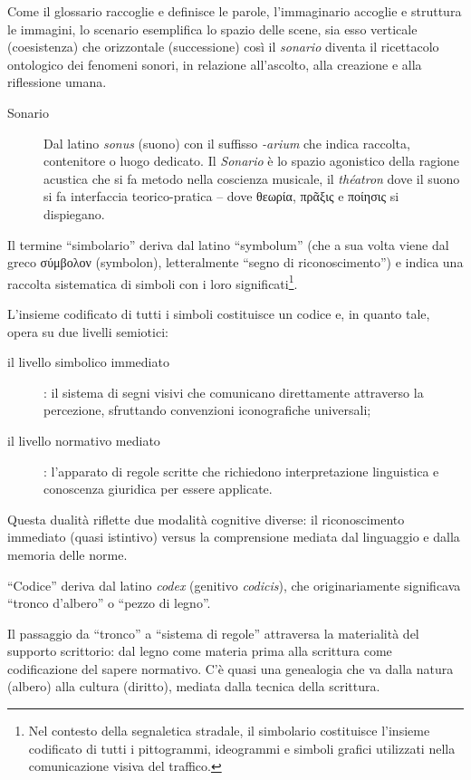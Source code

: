 Come il glossario raccoglie e definisce le parole, l'immaginario accoglie e
struttura le immagini, lo scenario esemplifica lo spazio delle scene, sia esso
verticale (coesistenza) che orizzontale (successione) così il \emph{sonario}
diventa il ricettacolo ontologico dei fenomeni sonori, in relazione all'ascolto,
alla creazione e alla riflessione umana.

\begin{description}
  \item[Sonario] Dal latino \emph{sonus} (suono) con il suffisso \emph{-arium}
  che indica raccolta, contenitore o luogo dedicato. Il \emph{Sonario} è lo
  spazio agonistico della ragione acustica che si fa metodo nella coscienza
  musicale, il \emph{théatron} dove il suono si fa interfaccia teorico-pratica –
  dove \textgreek{θεωρία}, \textgreek{πρᾶξις} e \textgreek{ποίησις} si dispiegano.
\end{description}

Il termine “simbolario” deriva dal latino “symbolum” (che a sua volta viene dal
greco \textgreek{σύμβολον} (symbolon), letteralmente “segno di riconoscimento”)
e indica una raccolta sistematica di simboli con i loro significati\footnote{Nel
contesto della segnaletica stradale, il simbolario costituisce l'insieme
codificato di tutti i pittogrammi, ideogrammi e simboli grafici utilizzati nella
comunicazione visiva del traffico.}.

L'insieme codificato di tutti i simboli costituisce un codice e, in quanto tale,
opera su due livelli semiotici:
\begin{description}
  \item[il livello simbolico immediato]: il sistema di segni visivi che
  comunicano direttamente attraverso la percezione, sfruttando convenzioni
  iconografiche universali;
  \item[il livello normativo mediato]: l'apparato di regole scritte che
  richiedono interpretazione linguistica e conoscenza giuridica per essere
  applicate.
\end{description}

Questa dualità riflette due modalità cognitive diverse: il riconoscimento
immediato (quasi istintivo) versus la comprensione mediata dal linguaggio e
dalla memoria delle norme.

“Codice” deriva dal latino \emph{codex} (genitivo \emph{codicis}), che
originariamente significava “tronco d'albero” o “pezzo di legno”.

Il passaggio da “tronco” a “sistema di regole” attraversa la materialità del
supporto scrittorio: dal legno come materia prima alla scrittura come
codificazione del sapere normativo. C'è quasi una genealogia che va dalla natura
(albero) alla cultura (diritto), mediata dalla tecnica della scrittura.

